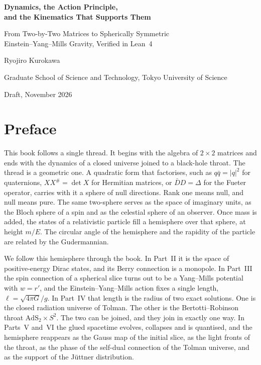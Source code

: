 \frontmatter
\begin{titlepage}
\centering\vspace*{30mm}
{\LARGE\bfseries Dynamics, the Action Principle,\\[0.4em] and the Kinematics That Supports Them\par}
\vspace{12mm}
{\large From Two-by-Two Matrices to Spherically Symmetric\\ Einstein--Yang--Mills Gravity, Verified in Lean~4\par}
\vspace{25mm}
{\large Ryojiro Kurokawa\par}
\vspace{4mm}
{\small Graduate School of Science and Technology, Tokyo University of Science\par}
\vfill
{\small Draft, November 2026\par}
\end{titlepage}

\chapter*{Preface}

This book follows a single thread. It begins with the algebra of $2\times2$ matrices and ends with the dynamics of a closed universe joined to a black-hole throat. The thread is a geometric one. A quadratic form that factorises, such as $q\bar q=|q|^2$ for quaternions, $X X^\#=\det X$ for Hermitian matrices, or $\bar DD=\Delta$ for the Fueter operator, carries with it a sphere of null directions. Rank one means null, and null means pure. The same two-sphere serves as the space of imaginary units, as the Bloch sphere of a spin and as the celestial sphere of an observer. Once mass is added, the states of a relativistic particle fill a hemisphere over that sphere, at height $m/E$. The circular angle of the hemisphere and the rapidity of the particle are related by the Gudermannian.

We follow this hemisphere through the book. In Part~II it is the space of positive-energy Dirac states, and its Berry connection is a monopole. In Part~III the spin connection of a spherical slice turns out to be a Yang--Mills potential with $w=r'$, and the Einstein--Yang--Mills action fixes a single length, $\ell=\sqrt{4\pi G}/g$. In Part~IV that length is the radius of two exact solutions. One is the closed radiation universe of Tolman. The other is the Bertotti--Robinson throat $\mathrm{AdS}_2\times S^2$. The two can be joined, and they join in exactly one way. In Parts~V and~VI the glued spacetime evolves, collapses and is quantised, and the hemisphere reappears as the Gauss map of the initial slice, as the light fronts of the throat, as the phase of the self-dual connection of the Tolman universe, and as the support of the J\"uttner distribution.

